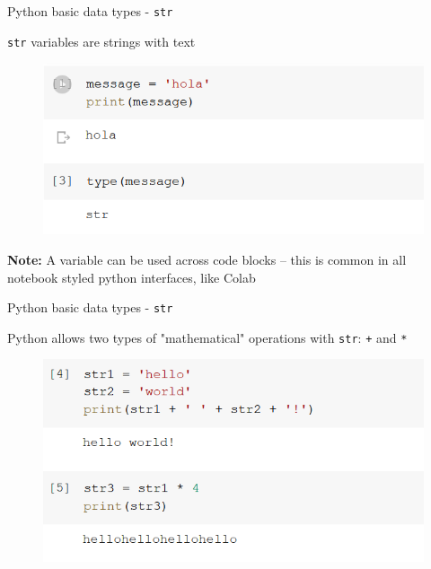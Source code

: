 \documentclass[aspectratio=169]{beamer}
\begin{document}
\begin{frame}{Python basic data types - \texttt{str}}

	\texttt{str} variables are strings with text

	\begin{figure}
		\centering
		\includegraphics[width=0.6\linewidth]{img/string_type.png}
	\end{figure}

	\textbf{Note:} A variable can be used across code blocks 
	-- this is common in all notebook styled python interfaces, like Colab

\end{frame}

\begin{frame}{Python basic data types - \texttt{str}}

	Python allows two types of "mathematical" operations with \texttt{str}: \texttt{+} and \texttt{*}

	\begin{figure}
		\centering
		\includegraphics[width=0.6\linewidth]{img/string_operations.png}
	\end{figure}

\end{frame}
\end{document}
